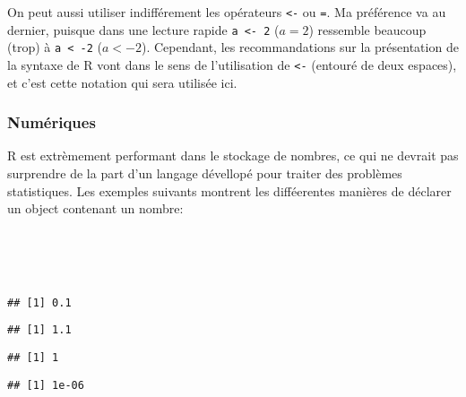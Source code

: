 On peut aussi utiliser indifférement les opérateurs \texttt{<-} ou \texttt{=}.
Ma préférence va au dernier, puisque dans une lecture rapide \texttt{a <- 2} ($a = 2$) ressemble beaucoup (trop) à \texttt{a < -2} ($a < -2$).
Cependant, les recommandations sur la présentation de la syntaxe de R vont dans le sens de l'utilisation de \texttt{<-} (entouré de deux espaces), et c'est cette notation qui sera utilisée ici.

\subsubsection{Numériques}

R est extrèmement performant dans le stockage de nombres, ce qui ne devrait pas surprendre de la part d'un langage dévellopé pour traiter des problèmes statistiques.
Les exemples suivants montrent les difféerentes manières de déclarer un object contenant un nombre:

\begin{knitrout}
\color{fgcolor}\begin{kframe}
\begin{flushleft}
\ttfamily\noindent
{}\hlassignement{\usebox{\hlnormalsizeboxlessthan}-}{\ }\hspace*{\fill}\\
\hlstd{}\hlassignement{\usebox{\hlnormalsizeboxlessthan}-}{\ }\hspace*{\fill}\\
\hlstd{}\hlassignement{\usebox{\hlnormalsizeboxlessthan}-}{\ }\hspace*{\fill}\\
\hlstd{}\mbox{}
\normalfont
\end{flushleft}
\begin{verbatim}
## [1] 0.1
\end{verbatim}
\begin{flushleft}
\ttfamily\noindent
{}\hlkeyword{+}{\ }\mbox{}
\normalfont
\end{flushleft}
\begin{verbatim}
## [1] 1.1
\end{verbatim}
\begin{flushleft}
\ttfamily\noindent
{}\mbox{}
\normalfont
\end{flushleft}
\begin{verbatim}
## [1] 1
\end{verbatim}
\begin{flushleft}
\ttfamily\noindent
{}\mbox{}
\normalfont
\end{flushleft}
\begin{verbatim}
## [1] 1e-06
\end{verbatim}
\end{kframe}
\end{knitrout}


